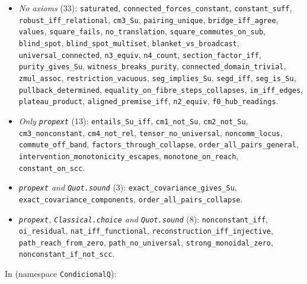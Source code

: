 \begin{itemize}\raggedright
\item \emph{No axioms} (33):
\texttt{saturated}, \texttt{connected\_forces\_constant}, \texttt{constant\_suff}, \texttt{robust\_iff\_relational}, \texttt{cm3\_Su}, \texttt{pairing\_unique}, \texttt{bridge\_iff\_agree}, \texttt{values}, \texttt{square\_fails}, \texttt{no\_translation}, \texttt{square\_commutes\_on\_sub}, \texttt{blind\_spot}, \texttt{blind\_spot\_multiset}, \texttt{blanket\_vs\_broadcast}, \texttt{universal\_connected}, \texttt{n3\_equiv}, \texttt{n4\_count}, \texttt{section\_factor\_iff}, \texttt{purity\_gives\_Su}, \texttt{witness\_breaks\_purity}, \texttt{connected\_domain\_trivial}, \texttt{zmul\_assoc}, \texttt{restriction\_vacuous}, \texttt{seg\_implies\_Su}, \texttt{segd\_iff}, \texttt{seg\_is\_Su}, \texttt{pullback\_determined}, \texttt{equality\_on\_fibre\_steps\_collapses}, \texttt{im\_iff\_edges}, \texttt{plateau\_product}, \texttt{aligned\_premise\_iff}, \texttt{n2\_equiv}, \texttt{f0\_hub\_readings}.
\item \emph{Only \texttt{propext}} (13):
\texttt{entails\_Su\_iff}, \texttt{cm1\_not\_Su}, \texttt{cm2\_not\_Su}, \texttt{cm3\_nonconstant}, \texttt{cm4\_not\_rel}, \texttt{tensor\_no\_universal}, \texttt{noncomm\_locus}, \texttt{commute\_off\_band}, \texttt{factors\_through\_collapse}, \texttt{order\_all\_pairs\_general}, \texttt{intervention\_monotonicity\_escapes}, \texttt{monotone\_on\_reach}, \texttt{constant\_on\_scc}.
\item \emph{\texttt{propext} and \texttt{Quot.sound}} (3):
\texttt{exact\_covariance\_gives\_Su}, \texttt{exact\_covariance\_components}, \texttt{order\_all\_pairs\_collapse}.
\item \emph{\texttt{propext}, \texttt{Classical.choice} and \texttt{Quot.sound}} (8):
\texttt{nonconstant\_iff}, \texttt{oi\_residual}, \texttt{nat\_iff\_functional}, \texttt{reconstruction\_iff\_injective}, \texttt{path\_reach\_from\_zero}, \texttt{path\_no\_universal}, \texttt{strong\_monoidal\_zero}, \texttt{nonconstant\_if\_not\_scc}.
\end{itemize}
In  (namespace \texttt{CondicionalQ}):
